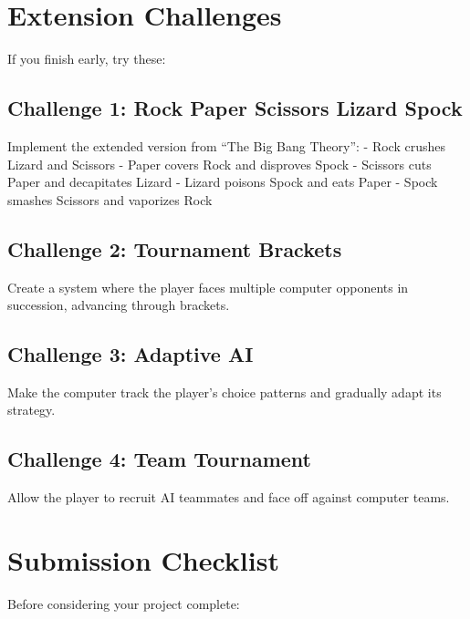 \documentclass[
  letterpaper,
  DIV=11,
  numbers=noendperiod,
  oneside]{scrreprt}
\begin{document}
\section{Extension Challenges}\label{extension-challenges-3}

If you finish early, try these:

\subsection{Challenge 1: Rock Paper Scissors Lizard
Spock}\label{challenge-1-rock-paper-scissors-lizard-spock}

Implement the extended version from ``The Big Bang Theory'': - Rock
crushes Lizard and Scissors - Paper covers Rock and disproves Spock -
Scissors cuts Paper and decapitates Lizard - Lizard poisons Spock and
eats Paper - Spock smashes Scissors and vaporizes Rock

\subsection{Challenge 2: Tournament
Brackets}\label{challenge-2-tournament-brackets}

Create a system where the player faces multiple computer opponents in
succession, advancing through brackets.

\subsection{Challenge 3: Adaptive AI}\label{challenge-3-adaptive-ai}

Make the computer track the player's choice patterns and gradually adapt
its strategy.

\subsection{Challenge 4: Team
Tournament}\label{challenge-4-team-tournament}

Allow the player to recruit AI teammates and face off against computer
teams.

\section{Submission Checklist}\label{submission-checklist-3}

Before considering your project complete:
\end{document}
